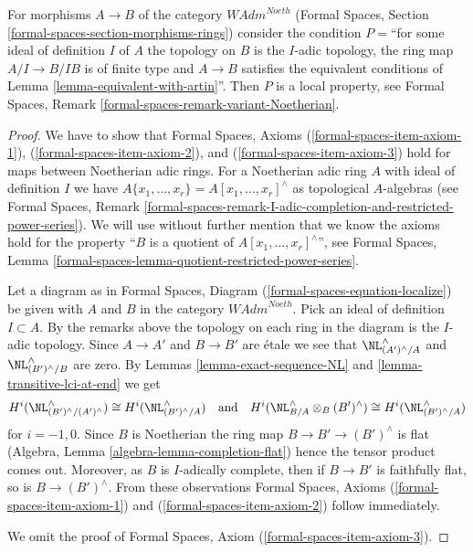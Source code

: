 \begin{lemma}
\label{lemma-rig-etale-axioms}
For morphisms $A \to B$ of the category $\textit{WAdm}^{Noeth}$
(Formal Spaces, Section \ref{formal-spaces-section-morphisms-rings})
consider the condition $P=$``for some ideal of definition $I$ of $A$
the topology on $B$ is the $I$-adic topology, the ring map $A/I \to B/IB$
is of finite type and $A \to B$ satisfies the equivalent conditions of
Lemma \ref{lemma-equivalent-with-artin}''. Then $P$ is a local property, see
Formal Spaces, Remark \ref{formal-spaces-remark-variant-Noetherian}.
\end{lemma}

\begin{proof}
We have to show that Formal Spaces, Axioms (\ref{formal-spaces-item-axiom-1}),
(\ref{formal-spaces-item-axiom-2}), and (\ref{formal-spaces-item-axiom-3})
hold for maps between Noetherian adic rings. For a Noetherian adic ring
$A$ with ideal of definition $I$ we have
$A\{x_1, \ldots, x_r\} = A[x_1, \ldots, x_r]^\wedge$ as topological
$A$-algebras (see Formal Spaces, Remark
\ref{formal-spaces-remark-I-adic-completion-and-restricted-power-series}).
We will use without further mention that we know the axioms hold
for the property ``$B$ is a quotient of $A[x_1, \ldots, x_r]^\wedge$'', see
Formal Spaces, Lemma
\ref{formal-spaces-lemma-quotient-restricted-power-series}.

\medskip\noindent
Let a diagram as in
Formal Spaces, Diagram (\ref{formal-spaces-equation-localize})
be given with $A$ and $B$ in the category $\textit{WAdm}^{Noeth}$.
Pick an ideal of definition $I \subset A$. By the remarks above
the topology on each ring in the diagram is the $I$-adic topology.
Since $A \to A'$ and $B \to B'$ are \'etale we see that
$\NL^\wedge_{(A')^\wedge/A}$ and $\NL^\wedge_{(B')^\wedge/B}$
are zero. By Lemmas \ref{lemma-exact-sequence-NL} and
\ref{lemma-transitive-lci-at-end} we get
$$
H^i(\NL^\wedge_{(B')^\wedge/(A')^\wedge})
\cong
H^i(\NL^\wedge_{(B')^\wedge/A})
\quad\text{and}\quad
H^i(\NL^\wedge_{B/A} \otimes_B (B')^\wedge) \cong
H^i(\NL^\wedge_{(B')^\wedge/A})
$$
for $i = -1, 0$. Since $B$ is Noetherian the ring map
$B \to B' \to (B')^\wedge$ is flat
(Algebra, Lemma \ref{algebra-lemma-completion-flat})
hence the tensor product comes out. Moreover, as $B$ is
$I$-adically complete, then if $B \to B'$ is faithfully flat,
so is $B \to (B')^\wedge$. From these observations
Formal Spaces, Axioms (\ref{formal-spaces-item-axiom-1})
and (\ref{formal-spaces-item-axiom-2}) follow immediately.

\medskip\noindent
We omit the proof of Formal Spaces, Axiom (\ref{formal-spaces-item-axiom-3}).
\end{proof}

